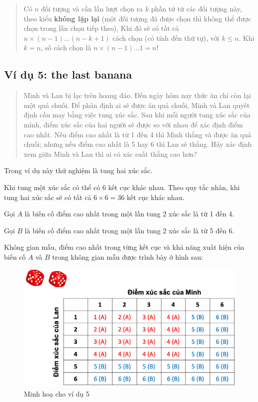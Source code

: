 \documentclass[
]{book}
\begin{document}
\begin{quote}
Có \(n\) đối tượng và cần lần lượt chọn ra \(k\) phần tử từ các đối tượng này, theo kiểu \textbf{không lặp lại} (một đối tượng đã được chọn thì không thể được chọn trong lần chọn tiếp theo). Khi đó sẽ có tất cả \(n \times (n-1) \ldots (n-k+1)\) cách chọn (có tính đến thứ tự), với \(k \leq n\). Khi \(k=n\), số cách chọn là \(n \times (n-1) \ldots 1 = n!\)
\end{quote}

\hypertarget{vuxed-dux1ee5-5-the-last-banana}{%
\subsection{Ví dụ 5: the last banana}\label{vuxed-dux1ee5-5-the-last-banana}}

\begin{quote}
Minh và Lan bị lạc trên hoang đảo. Đến ngày hôm nay thức ăn chỉ còn lại một quả chuối. Để phân định ai sẽ được ăn quả chuối, Minh và Lan quyết định cầu may bằng việc tung xúc sắc. Sau khi mỗi người tung xúc sắc của mình, điểm xúc sắc của hai người sẽ được so với nhau để xác định điểm cao nhất. Nếu điểm cao nhất là từ 1 đến 4 thì Minh thắng và được ăn quả chuối; nhưng nếu điểm cao nhất là 5 hay 6 thì Lan sẽ thắng. Hãy xác định xem giữa Minh và Lan thì ai có xác suất thắng cao hơn?
\end{quote}

Trong ví dụ này thử nghiệm là tung hai xúc sắc.

Khi tung một xúc sắc có thể có 6 kết cục khác nhau. Theo quy tắc nhân, khi tung hai xúc sắc sẽ có tất cả \(6 \times 6 = 36\) kết cục khác nhau.

Gọi \(A\) là biến cố điểm cao nhất trong một lần tung 2 xúc sắc là từ 1 đến 4.

Gọi \(B\) là biến cố điểm cao nhất trong một lần tung 2 xúc sắc là từ 5 đến 6.

Không gian mẫu, điểm cao nhất trong từng kết cục và khả năng xuất hiện của biến cố \(A\) và \(B\) trong không gian mẫu được trình bày ở hình sau:

\begin{figure}
\includegraphics[width=21.94in]{figures/Picture04} \caption{Minh hoạ cho ví dụ 5}\label{fig:example5}
\end{figure}
\end{document}
